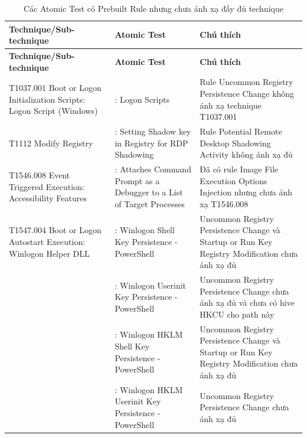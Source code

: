 \begingroup
\small
\renewcommand{\arraystretch}{1.12}
\setlength{\LTpre}{0pt}
\setlength{\LTpost}{0pt}
\begin{longtable}{|>{\raggedright\arraybackslash}p{3.2cm}|>{\raggedright\arraybackslash}p{5.5cm}|>{\raggedright\arraybackslash}p{5.8cm}|}
\caption{Các Atomic Test có Prebuilt Rule nhưng chưa ánh xạ đầy đủ technique}\label{tab:khong-anh-xa}\\
\hline
\textbf{Technique/Sub-technique} & \textbf{Atomic Test} & \textbf{Chú thích} \\
\hline
\endfirsthead
\hline
\textbf{Technique/Sub-technique} & \textbf{Atomic Test} & \textbf{Chú thích} \\
\hline
\endhead
\hline
\endfoot
\hline
\endlastfoot
T1037.001 Boot or Logon Initialization Scripts: Logon Script (Windows) & 1: Logon Scripts & Rule Uncommon Registry Persistence Change không ánh xạ technique T1037.001 \\
\hline
T1112 Modify Registry & 72: Setting Shadow key in Registry for RDP Shadowing & Rule Potential Remote Desktop Shadowing Activity không ánh xạ đủ \\
\hline
T1546.008 Event Triggered Execution: Accessibility Features & 1: Attaches Command Prompt as a Debugger to a List of Target Processes & Đã có rule Image File Execution Options Injection nhưng chưa ánh xạ T1546.008 \\
\hline
T1547.004 Boot or Logon Autostart Execution: Winlogon Helper DLL & 1: Winlogon Shell Key Persistence - PowerShell & Uncommon Registry Persistence Change và Startup or Run Key Registry Modification chưa ánh xạ đủ \\*
\cline{2-3}
 & 2: Winlogon Userinit Key Persistence - PowerShell & Uncommon Registry Persistence Change chưa ánh xạ đủ và chưa có hive HKCU cho path này \\*
\cline{2-3}
 & 4: Winlogon HKLM Shell Key Persistence - PowerShell & Uncommon Registry Persistence Change và Startup or Run Key Registry Modification chưa ánh xạ đủ \\*
\cline{2-3}
 & 5: Winlogon HKLM Userinit Key Persistence - PowerShell & Uncommon Registry Persistence Change chưa ánh xạ đủ \\
\hline
\end{longtable}
\endgroup
